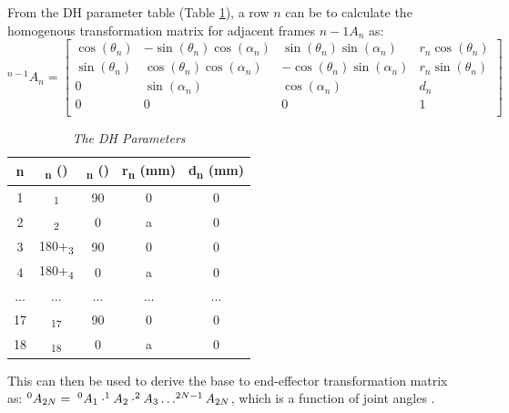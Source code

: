 \documentclass[a4paper,12pt]{report}
\begin{document}
From the DH parameter table (Table \ref{d-h-params}), a row $n$ can be to calculate the homogenous transformation matrix for adjacent frames ${n-1}A_{n}$ as:
\[
{}^{n-1}A_{n}=
\begin{bmatrix}
\cos(\theta_{n}) & -\sin(\theta_{n})\cos(\alpha_{n}) & \sin(\theta_{n})\sin(\alpha_{n}) & r_{n}\cos(\theta_{n})\\
\sin(\theta_{n}) & \cos(\theta_{n})\cos(\alpha_{n}) & -\cos(\theta_{n})\sin(\alpha_{n}) & r_{n}\sin(\theta_{n})\\
0 & \sin(\alpha_{n}) & \cos(\alpha_{n}) & d_{n}\\
0 & 0 & 0 & 1\\
\end{bmatrix}
\]
\begin{table}
	\begin{tabular}{|c|c|c|c|c|}
		\hline
		\textbf{n}&\textbf{\straighttheta \textsubscript{n} (\textdegree)} & \textbf{\textalpha\textsubscript{n} (\textdegree)} & \textbf{r\textsubscript{n} (mm)} & \textbf{d\textsubscript{n} (mm)}\\
		\hline
		1&\straighttheta \textsubscript{1}&90&0&0\\
		2&\straighttheta \textsubscript{2}&0&a&0\\
		3&180+\straighttheta \textsubscript{3}&90&0&0\\
		4&180+\straighttheta \textsubscript{4}&0&a&0\\
		$\ldots$&$\ldots$&$\ldots$&$\ldots$&$\ldots$\\
		17&\straighttheta \textsubscript{17}&90&0&0\\
		18&\straighttheta \textsubscript{18}&0&a&0\\
		\hline
	\end{tabular}
	\caption{\textit{The DH Parameters}} 
	\label{d-h-params}
\end{table}

This can then be used to derive the base to end-effector transformation matrix as: $^{0}A_{2N}= \hspace{1mm}^{0}A_{1}\cdot ^{1}A_{2}\cdot ^{2}A_{3}\ldots ^{2N-1}A_{2N} $,  which is a function of joint angles \straighttheta.
\end{document}
